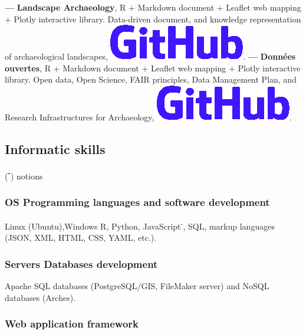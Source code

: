 \documentclass{article}
\begin{document}
\smallbreak
\textbf{--- }\textbf{Landscape Archaeology}, \textsf{R} + \textsf{Markdown} document + \textsf{Leaflet} web mapping + \textsf{Plotly} interactive library. Data-driven document, and knowledge representation of archaeological landscapes, \href{https://zoometh.github.io/popland}{\includegraphics[scale=0.12]{github-rect.png}}.
\smallbreak
\textbf{--- }\textbf{Donn\'{e}es ouvertes}, \textsf{R} + \textsf{Markdown} document + \textsf{Leaflet} web mapping + \textsf{Plotly} interactive library. Open data, Open Science, FAIR principles, Data Management Plan, and Research Infrastructures for Archaeology, \href{https://zoometh.github.io/LOD}{\includegraphics[scale=0.12]{github-rect.png}}.

\subsection*{Informatic skills}
\begin{center}(\textbf{\textsuperscript{-}}) notions \end{center}
\smallbreak

\subsubsection*{OS {\textbar} Programming languages and software development}

Linux (Ubuntu),Windows \textbf{{\textbar}} \textsf{R}, \textsf{Python}, \textsf{JavaScript\textsuperscript{-}}, SQL, markup languages (JSON, XML, HTML, CSS, YAML, etc.).

\subsubsection*{Servers {\textbar} Databases development} 

Apache \textbf{{\textbar}} SQL databases (PostgreSQL/GIS, FileMaker server) and NoSQL databases (Arches).

\subsubsection*{Web application framework} 
\end{document}
